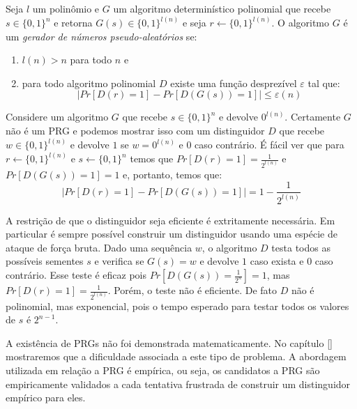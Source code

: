 \begin{definition}
  Seja $l$ um polinômio e $G$ um algoritmo determinístico polinomial que recebe $s \in \{0,1\}^n$ e retorna $G(s) \in \{0,1\}^{l(n)}$ e seja $r \leftarrow \{0,1\}^{l(n)}$.
  O algoritmo $G$ é um {\em gerador de números pseudo-aleatórios} se:
\begin{enumerate}
\item $l(n) > n$ para todo $n$ e
\item para todo algoritmo polinomial $D$ existe uma função desprezível $\varepsilon$ tal que:
\begin{displaymath}
  |Pr[D(r) = 1] - Pr[D(G(s)) = 1]| \leq \varepsilon(n)  
\end{displaymath}
\end{enumerate}
\end{definition}


\begin{example}
  Considere um algoritmo $G$ que recebe $s \in \{0,1\}^n$ e devolve $0^{l(n)}$.
  Certamente $G$ não é um PRG e podemos mostrar isso com um distinguidor $D$ que recebe $w \in \{0,1\}^{l(n)}$ e devolve $1$ se $w = 0^{l(n)}$ e $0$ caso contrário.
  É fácil ver que para $r \leftarrow \{0,1\}^{l(n)}$ e $s \leftarrow \{0,1\}^n$ temos que $Pr[D(r) = 1] = \frac{1}{2^{l(n)}}$ e $Pr[D(G(s)) = 1] = 1$ e, portanto, temos que:
\begin{displaymath}
  |Pr[D(r) = 1] - Pr[D(G(s)) = 1]| = 1 - \frac{1}{2^{l(n)}}
\end{displaymath}

\end{example}


A restrição de que o distinguidor seja eficiente é extritamente necessária.
Em particular é sempre possível construir um distinguidor usando uma espécie de ataque de força bruta.
Dado uma sequência $w$, o algoritmo $D$ testa todos as possíveis sementes $s$ e verifica se $G(s) = w$ e devolve $1$ caso exista e $0$ caso contrário.
Esse teste é eficaz pois $Pr[D(G(s)) = \frac{1}{2^n}] = 1$, mas $Pr[D(r) = 1] = \frac{1}{2^{l(n)}}$.
Porém, o teste não é eficiente.
De fato $D$ não é polinomial, mas exponencial, pois o tempo esperado para testar todos os valores de $s$ é $2^{n-1}$. 


A existência de PRGs não foi demonstrada matematicamente.
No capítulo \ref{} mostraremos que a dificuldade associada a este tipo de problema.
A abordagem utilizada em relação a PRG é empírica, ou seja, os candidatos a PRG são empiricamente validados a cada tentativa frustrada de construir um distinguidor empírico para eles.

